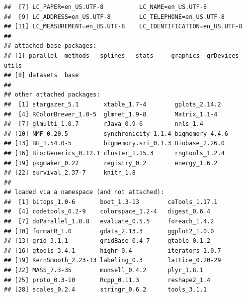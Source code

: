 \documentclass{article}\usepackage[]{graphicx}\usepackage[]{color}
\makeatletter
\newenvironment{kframe}{%
 \def\at@end@of@kframe{}%
 \ifinner\ifhmode%
  \def\at@end@of@kframe{\end{minipage}}%
  \begin{minipage}{\columnwidth}%
 \fi\fi%
 \def\FrameCommand##1{\hskip\@totalleftmargin \hskip-\fboxsep
 \colorbox{shadecolor}{##1}\hskip-\fboxsep
     \hskip-\linewidth \hskip-\@totalleftmargin \hskip\columnwidth}%
 \MakeFramed {\advance\hsize-\width
   \@totalleftmargin\z@ \linewidth\hsize
   \@setminipage}}%
 {\par\unskip\endMakeFramed%
 \at@end@of@kframe}
\newenvironment{knitrout}{}{} %
\makeatother
\begin{document}
\begin{knitrout}
\begin{kframe}
\begin{verbatim}
##  [7] LC_PAPER=en_US.UTF-8          LC_NAME=en_US.UTF-8          
##  [9] LC_ADDRESS=en_US.UTF-8        LC_TELEPHONE=en_US.UTF-8     
## [11] LC_MEASUREMENT=en_US.UTF-8    LC_IDENTIFICATION=en_US.UTF-8
## 
## attached base packages:
## [1] parallel  methods   splines   stats     graphics  grDevices utils    
## [8] datasets  base     
## 
## other attached packages:
##  [1] stargazer_5.1       xtable_1.7-4        gplots_2.14.2      
##  [4] RColorBrewer_1.0-5  glmnet_1.9-8        Matrix_1.1-4       
##  [7] glmulti_1.0.7       rJava_0.9-6         nnls_1.4           
## [10] NMF_0.20.5          synchronicity_1.1.4 bigmemory_4.4.6    
## [13] BH_1.54.0-5         bigmemory.sri_0.1.3 Biobase_2.26.0     
## [16] BiocGenerics_0.12.1 cluster_1.15.3      rngtools_1.2.4     
## [19] pkgmaker_0.22       registry_0.2        energy_1.6.2       
## [22] survival_2.37-7     knitr_1.8          
## 
## loaded via a namespace (and not attached):
##  [1] bitops_1.0-6       boot_1.3-13        caTools_1.17.1    
##  [4] codetools_0.2-9    colorspace_1.2-4   digest_0.6.4      
##  [7] doParallel_1.0.8   evaluate_0.5.5     foreach_1.4.2     
## [10] formatR_1.0        gdata_2.13.3       ggplot2_1.0.0     
## [13] grid_3.1.1         gridBase_0.4-7     gtable_0.1.2      
## [16] gtools_3.4.1       highr_0.4          iterators_1.0.7   
## [19] KernSmooth_2.23-13 labeling_0.3       lattice_0.20-29   
## [22] MASS_7.3-35        munsell_0.4.2      plyr_1.8.1        
## [25] proto_0.3-10       Rcpp_0.11.3        reshape2_1.4      
## [28] scales_0.2.4       stringr_0.6.2      tools_3.1.1
\end{verbatim}
\end{kframe}
\end{knitrout}
\end{document}
